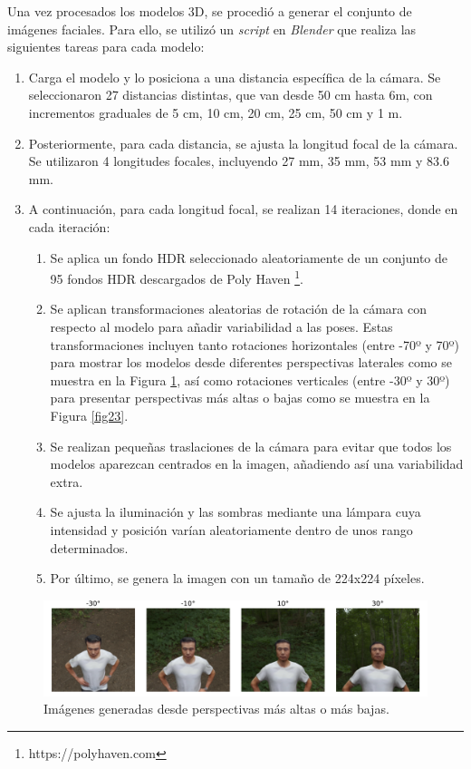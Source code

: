 Una vez procesados los modelos 3D, se procedió a generar el conjunto de imágenes faciales. Para ello, se utilizó un \textit{script} en \textit{Blender} que realiza las siguientes tareas para cada modelo:

\renewcommand{\theenumii}{\arabic{enumii}}

\begin{enumerate}
	\item Carga el modelo y lo posiciona a una distancia específica de la cámara. Se seleccionaron 27 distancias distintas, que van desde 50 cm hasta 6m, con incrementos graduales de 5 cm, 10 cm, 20 cm, 25 cm, 50 cm y 1 m.
	\item Posteriormente, para cada distancia, se ajusta la longitud focal de la cámara. Se utilizaron 4 longitudes focales, incluyendo 27 mm, 35 mm, 53 mm y 83.6 mm.
	\item A continuación, para cada longitud focal, se realizan 14 iteraciones, donde en cada iteración:
	\begin{enumerate}
		\item Se aplica un fondo HDR seleccionado aleatoriamente de un conjunto de 95 fondos HDR descargados de Poly Haven \footnote{https://polyhaven.com}.
		\item Se aplican transformaciones aleatorias de rotación de la cámara con respecto al modelo para añadir variabilidad a las poses. Estas transformaciones incluyen tanto rotaciones horizontales (entre -70º y 70º) para mostrar los modelos desde diferentes perspectivas laterales como se muestra en la Figura \ref{fig22}, así como rotaciones verticales (entre -30º y 30º) para presentar perspectivas más altas o bajas como se muestra en la Figura \ref{fig23}.
		\item Se realizan pequeñas traslaciones de la cámara para evitar que todos los modelos aparezcan centrados en la imagen, añadiendo así una variabilidad extra.
		\item Se ajusta la iluminación y las sombras mediante una lámpara cuya intensidad y posición varían aleatoriamente dentro de unos rango determinados.
		\item Por último, se genera la imagen con un tamaño de 224x224 píxeles.
	\end{enumerate}
\end{enumerate}

\begin{figure}[h]
	\centering
	\includegraphics[scale=0.4]{imagenes/cap4/imagenes_rotacion_vertical.png}
	\caption[Ejemplos de imágenes rotadas verticalmente.]{Imágenes generadas desde perspectivas más altas o más bajas.}
	\label{fig22}
\end{figure}

